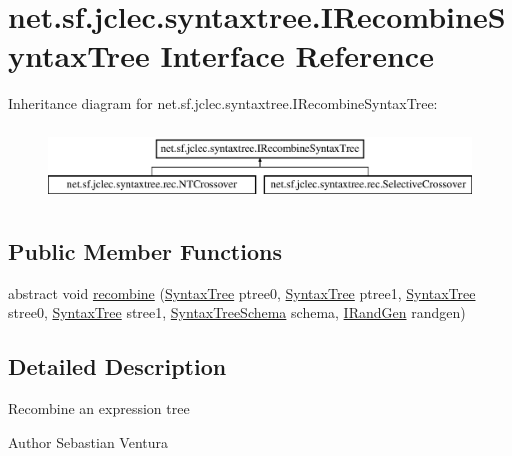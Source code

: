 \hypertarget{interfacenet_1_1sf_1_1jclec_1_1syntaxtree_1_1_i_recombine_syntax_tree}{\section{net.\-sf.\-jclec.\-syntaxtree.\-I\-Recombine\-Syntax\-Tree Interface Reference}
\label{interfacenet_1_1sf_1_1jclec_1_1syntaxtree_1_1_i_recombine_syntax_tree}
}
Inheritance diagram for net.\-sf.\-jclec.\-syntaxtree.\-I\-Recombine\-Syntax\-Tree\-:\begin{figure}[H]
\begin{center}
\leavevmode
\includegraphics[height=1.985816cm]{interfacenet_1_1sf_1_1jclec_1_1syntaxtree_1_1_i_recombine_syntax_tree}
\end{center}
\end{figure}
\subsection*{Public Member Functions}
\begin{DoxyCompactItemize}
\item 
abstract void \hyperlink{interfacenet_1_1sf_1_1jclec_1_1syntaxtree_1_1_i_recombine_syntax_tree_a4187214454e215f9d481f4a26e0584f1}{recombine} (\hyperlink{classnet_1_1sf_1_1jclec_1_1syntaxtree_1_1_syntax_tree}{Syntax\-Tree} ptree0, \hyperlink{classnet_1_1sf_1_1jclec_1_1syntaxtree_1_1_syntax_tree}{Syntax\-Tree} ptree1, \hyperlink{classnet_1_1sf_1_1jclec_1_1syntaxtree_1_1_syntax_tree}{Syntax\-Tree} stree0, \hyperlink{classnet_1_1sf_1_1jclec_1_1syntaxtree_1_1_syntax_tree}{Syntax\-Tree} stree1, \hyperlink{classnet_1_1sf_1_1jclec_1_1syntaxtree_1_1_syntax_tree_schema}{Syntax\-Tree\-Schema} schema, \hyperlink{interfacenet_1_1sf_1_1jclec_1_1util_1_1random_1_1_i_rand_gen}{I\-Rand\-Gen} randgen)
\end{DoxyCompactItemize}


\subsection{Detailed Description}
Recombine an expression tree

\begin{DoxyAuthor}{Author}
Sebastian Ventura 
\end{DoxyAuthor}


